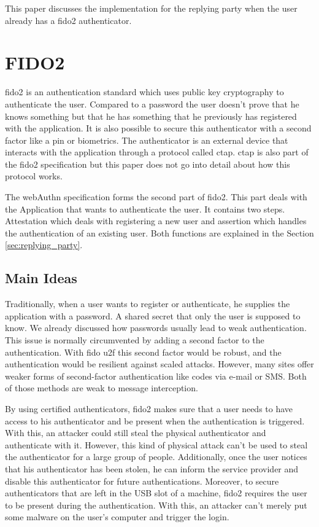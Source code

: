 \documentclass[a4paper, 11pt]{scrartcl}
\begin{document}
This paper discusses the implementation for the replying party when the user already has a \gls{fido2} authenticator.

\section{FIDO2}

\gls{fido2} is an authentication standard which uses public key cryptography to authenticate the user. Compared to a password the user doesn't prove that he knows something but that he has something that he previously has registered with the application. It is also possible to secure this authenticator with a second factor like a pin or biometrics. The authenticator is an external device that interacts with the application through a protocol called \gls{ctap}. \gls{ctap} is also part of the \gls{fido2} specification but this paper does not go into detail about how this protocol works. \cite{ctap}

The \gls{webAuthn} specification forms the second part of \gls{fido2}. This part deals with the Application that wants to authenticate the user. It contains two steps. Attestation which deals with registering a new user and assertion which handles the authentication of an existing user. Both functions are explained in the Section \ref{sec:replying_party}.

\subsection{Main Ideas}

Traditionally, when a user wants to register or authenticate, he supplies the application with a password. A shared secret that only the user is supposed to know. We already discussed how passwords usually lead to weak authentication. This issue is normally circumvented by adding a second factor to the authentication. With \gls{fido} \gls{u2f} this second factor would be robust, and the authentication would be resilient against scaled attacks. However, many sites offer weaker forms of second-factor authentication like codes via e-mail or SMS. Both of those methods are weak to message interception. \cite{smsweak}

By using certified authenticators, \gls{fido2} makes sure that a user needs to have access to his authenticator and be present when the authentication is triggered. With this, an attacker could still steal the physical authenticator and authenticate with it. However, this kind of physical attack can't be used to steal the authenticator for a large group of people. Additionally, once the user notices that his authenticator has been stolen, he can inform the service provider and disable this authenticator for future authentications. Moreover, to secure authenticators that are left in the USB slot of a machine, \gls{fido2} requires the user to be present during the authentication. With this, an attacker can't merely put some malware on the user's computer and trigger the login. 
\end{document}
